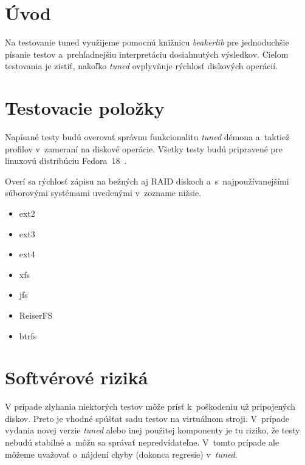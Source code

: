 \section{Úvod}

Na testovanie tuned využijeme pomocnú knižnicu \emph{beakerlib}
\cite{beakerlibHomepage} pre jednoduchšie písanie testov a~prehľadnejšiu
interpretáciu dosiahnutých výsledkov. Cieľom testovania je zistiť, nakoľko
\emph{tuned} ovplyvňuje rýchlosť diskových operácií.

\section{Testovacie položky}

Napísané testy budú overovať správnu funkcionalitu \emph{tuned} démona a~taktiež
profilov v~zameraní na diskové operácie. Všetky testy budú
pripravené pre linuxovú distribúciu Fedora~18~\cite{fedoraHomepage}.

Overí sa rýchlosť zápisu na bežných aj RAID diskoch a~s~najpoužívanejšími
súborovými systémami uvedenými v~zozname nižsie.

\begin{itemize}
    \item ext2
    \item ext3
    \item ext4
    \item xfs
    \item jfs
    \item ReiserFS
    \item btrfs
\end{itemize}


\section{Softvérové riziká}
\label{sec:softverove-rizika}

V prípade zlyhania niektorých testov môže prísť k~poškodeniu už pripojených
diskov. Preto je vhodné spúšťat sadu testov na virtuálnom stroji. V~prípade
vydania novej verzie \emph{tuned} alebo inej použitej komponenty je tu riziko,
že testy nebudú stabilné a~môžu sa správať nepredvídateľne. V~tomto prípade ale
môžeme uvažovať o~nájdení chyby (dokonca regresie) v~\emph{tuned}.

